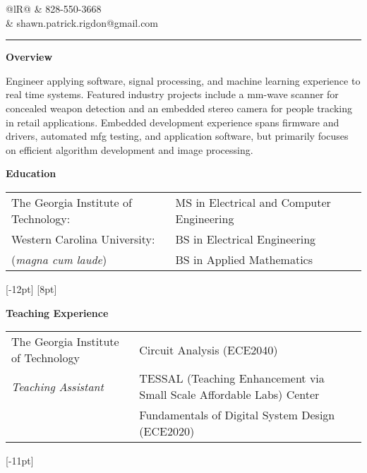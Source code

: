 \documentclass[14pt,letterpaper]{extarticle}
\begin{document}
\pagestyle{empty}


\noindent
\begin{tabularx}{\linewidth}{@{}lR@{}}
 & \footnotesize{828-550-3668} \\[-4pt]
& \footnotesize{shawn.patrick.rigdon@gmail.com} \\[-4pt]
\end{tabularx}

\smallskip
\noindent\rule[\baselineskip]{\linewidth}{1.5pt}


\noindent\textbf{\large{Overview}}

\medskip
\noindent\footnotesize{Engineer applying software, signal processing, and machine learning experience
to real time systems.  Featured industry projects include a mm-wave scanner for concealed weapon
detection and an embedded stereo camera for people tracking in retail applications.  Embedded development
experience spans firmware and drivers, automated mfg testing, and application software, but primarily
focuses on efficient algorithm development and image processing.}

\bigskip
\noindent\textbf{\large{Education}}

\medskip\noindent
\begin{tabular}{@{}ll@{}}
\footnotesize{The Georgia Institute of Technology:} & \footnotesize{MS in Electrical and Computer Engineering}\\[5pt]
\footnotesize{Western Carolina University:} & \footnotesize{BS in Electrical Engineering}\\
\footnotesize{(\textit{magna cum laude})} & \footnotesize{BS in Applied Mathematics}\\
\end{tabular}
[-12pt]
[8pt]

\bigskip
\noindent\textbf{\large{Teaching Experience}}

\medskip\noindent
\begin{tabular}{@{}ll@{}}
\footnotesize{The Georgia Institute of Technology} & \footnotesize{Circuit Analysis (ECE2040)}\\
\footnotesize{\textit{Teaching Assistant}} & \footnotesize{TESSAL (Teaching Enhancement via Small Scale Affordable Labs) Center}\\
& \footnotesize{Fundamentals of Digital System Design
(ECE2020)}\\
\end{tabular}
[-11pt]
\end{document}
